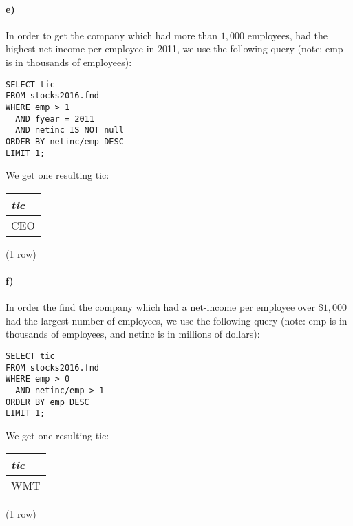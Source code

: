 \documentclass[]{article}
\let\oldparagraph\paragraph
\renewcommand{\paragraph}[1]{\oldparagraph{#1}\mbox{}}
\begin{document}
\paragraph{e)}
In order to get the company which had more than $1,000$ employees, had the highest net income per employee in 2011, we use the following query (note: emp is in thousands of employees):

\color{blue}
\begin{verbatim}
SELECT tic
FROM stocks2016.fnd
WHERE emp > 1
  AND fyear = 2011
  AND netinc IS NOT null
ORDER BY netinc/emp DESC
LIMIT 1;
\end{verbatim}
\color{black}

We get one resulting tic:

\begin{center}
\begin{tabular}{|l|}
\hline
\textit{tic} \\
\hline
CEO \\
\hline
\end{tabular}

\noindent (1 row) \\
\end{center}

\paragraph{f)}
In order the find the company which had a net-income per employee over \$$1,000$ had the largest number of employees, we use the following query (note: emp is in thousands of employees, and netinc is in millions of dollars):

\color{blue}
\begin{verbatim}
SELECT tic
FROM stocks2016.fnd
WHERE emp > 0
  AND netinc/emp > 1
ORDER BY emp DESC
LIMIT 1;
\end{verbatim}
\color{black}

We get one resulting tic:

\begin{center}
\begin{tabular}{|l|}
\hline
\textit{tic} \\
\hline
WMT \\
\hline
\end{tabular}

\noindent (1 row) \\
\end{center}
\end{document}
